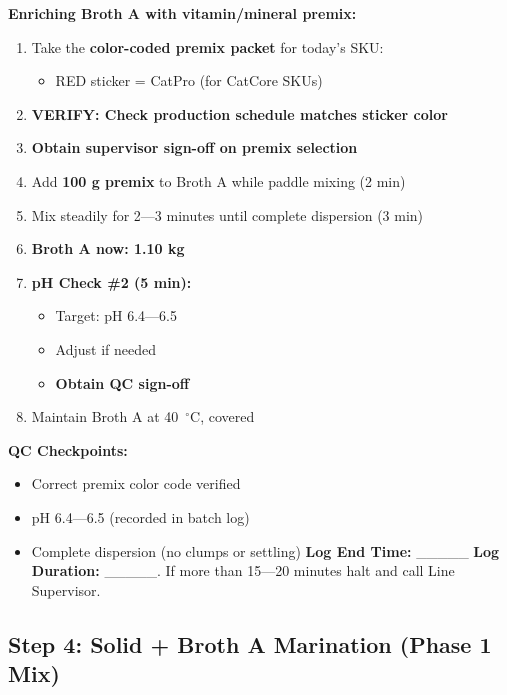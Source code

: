 {\textbf{Enriching Broth A with vitamin/mineral premix:}
\begin{enumerate}[resume,leftmargin=1.5em]
\item Take the \textbf{color-coded premix packet} for today's SKU:
  \begin{itemize}
  \item RED sticker = CatPro (for CatCore SKUs)
  \end{itemize}
\item \textbf{VERIFY: Check production schedule matches sticker color}
\item \textbf{Obtain supervisor sign-off on premix selection}
\item Add \textbf{100 g premix} to Broth A while paddle mixing (2 min)
\item Mix steadily for 2---3 minutes until complete dispersion (3 min)
\item \textbf{Broth A now: 1.10 kg}
\item \textbf{pH Check \#2 (5 min):}
  \begin{itemize}
  \item Target: pH 6.4---6.5
  \item Adjust if needed
  \item \textbf{Obtain QC sign-off}
  \end{itemize}
\item Maintain Broth A at 40~$^\circ$C, covered
\end{enumerate}

\textbf{QC Checkpoints:}
\begin{itemize}
\item Correct premix color code verified
\item pH 6.4---6.5 (recorded in batch log)
\item Complete dispersion (no clumps or settling)
\textbf{Log End Time:} \_\_\_\_\_
\textbf{Log Duration:} \_\_\_\_\_. If more than 15---20 minutes halt and call Line Supervisor. 
\end{itemize}




\subsection*{Step 4: Solid + Broth A Marination (Phase 1 Mix)}

}
